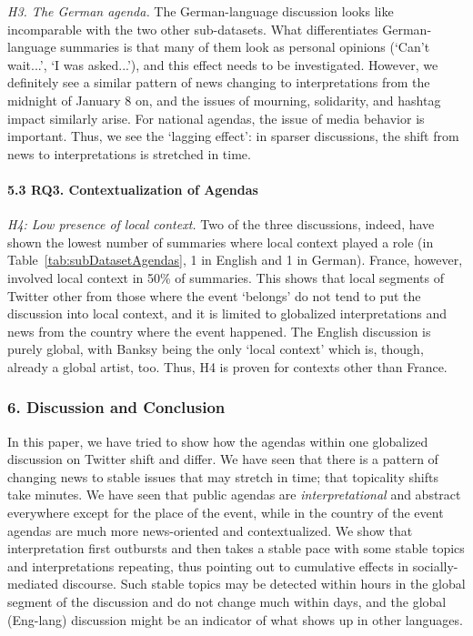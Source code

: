 \textit{H3. The German agenda.} The German-language discussion looks like incomparable with the two other sub-datasets. What differentiates German-language summaries is that many of them look as personal opinions (‘Can’t wait...’, ‘I was asked...’), and this effect needs to be investigated. However, we definitely see a similar pattern of news changing to interpretations from the midnight of January 8 on, and the issues of mourning, solidarity, and hashtag impact similarly arise. For national agendas, the issue of media behavior is important. Thus, we see the ‘lagging effect’: in sparser discussions, the shift from news to interpretations is stretched in time.

\paragraph{5.3 RQ3. Contextualization of Agendas}

\textit{H4: Low presence of local context.} Two of the three discussions, indeed, have shown the lowest number of summaries where local context played a role (in Table~\cref{tab:subDatasetAgendas}, 1 in English and 1 in German). France, however, involved local context in 50\% of summaries. This shows that local segments of Twitter other from those where the event ‘belongs’ do not tend to put the discussion into local context, and it is limited to globalized interpretations and news from the country where the event happened. The English discussion is purely global, with Banksy being the only ‘local context’ which is, though, already a global artist, too. Thus, H4 is proven for contexts other than France.

\subsubsection{6. Discussion and Conclusion}

In this paper, we have tried to show how the agendas within one globalized discussion on Twitter shift and differ. We have seen that there is a pattern of changing news to stable issues that may stretch in time; that topicality shifts take minutes. We have seen that public agendas are \textit{interpretational} and abstract everywhere except for the place of the event, while in the country of the event agendas are much more news-oriented and contextualized. We show that interpretation first outbursts and then takes a stable pace with some stable topics and interpretations repeating, thus pointing out to cumulative effects in socially-mediated discourse. Such stable topics may be detected within hours in the global segment of the discussion and do not change much within days, and the global (Eng-lang) discussion might be an indicator of what shows up in other languages.


